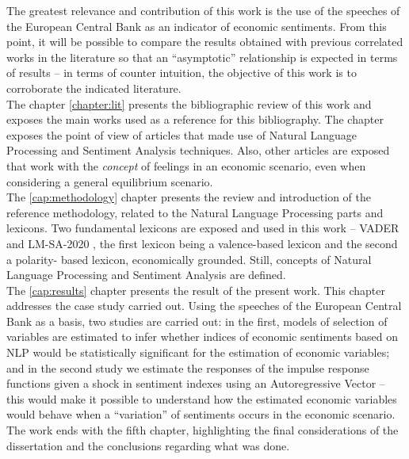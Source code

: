 The greatest relevance and contribution of this work is the use of the speeches of the European Central Bank as an indicator of economic sentiments. From this point, it will be possible to compare the results obtained with previous correlated works in the literature so that an “asymptotic” relationship is expected in terms of results -- in terms of counter intuition, the objective of this work is to corroborate the indicated literature.\\

The chapter \ref{chapter:lit} presents the bibliographic review of this work and exposes the main works used as a reference for this bibliography. The chapter exposes the point of view of \cite{shapiro2020measuring, shapiro2021taking} articles that made use of Natural Language Processing and Sentiment Analysis techniques. Also, other articles \cite{barsky2012information, angeletos2013sentiments} are exposed that work with the \textit{concept} of feelings in an economic scenario, even when considering a general equilibrium scenario.\\

The \ref{cap:methodology} chapter presents the review and introduction of the reference methodology, related to the Natural Language Processing parts and lexicons. Two fundamental lexicons are exposed and used in this work -- VADER \cite[]{hutto2014vader} and LM-SA-2020 \cite[]{lmdata}, the first lexicon being a valence-based lexicon and the second a polarity- based lexicon, economically grounded. Still, concepts of Natural Language Processing and Sentiment Analysis are defined.\\

The \ref{cap:results} chapter presents the result of the present work. This chapter addresses the case study carried out. Using the speeches of the European Central Bank as a basis, two studies are carried out: in the first, models of selection of variables are estimated to infer whether indices of economic sentiments based on NLP would be statistically significant for the estimation of economic variables; and in the second study we estimate the responses of the impulse response functions given a shock in sentiment indexes using an Autoregressive Vector -- this would make it possible to understand how the estimated economic variables would behave when a ``variation'' of sentiments occurs in the economic scenario.\\

The work ends with the fifth chapter, highlighting the final considerations of the dissertation and the conclusions regarding what was done.
